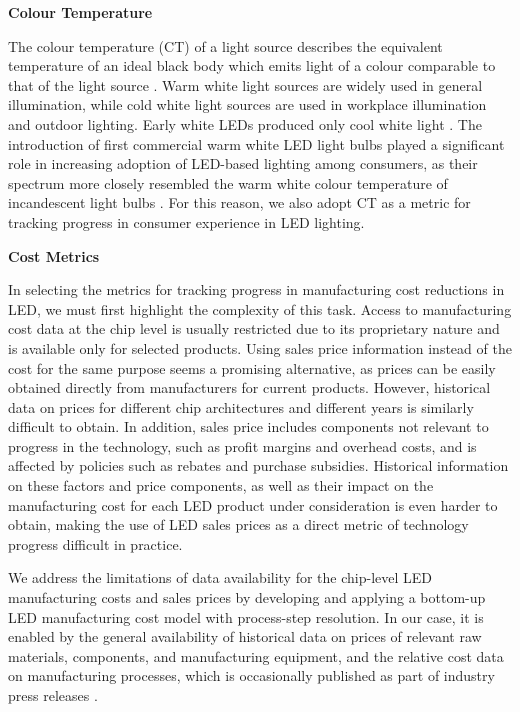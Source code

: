 \documentclass[parskip=full]{article}
\begin{document}
\textbf{Colour Temperature}

The colour temperature (CT) of a light source describes the equivalent temperature of an ideal black body which emits light of a colour comparable to that of the light source \cite{commission2011cie}. Warm white light sources are widely used in general illumination, while cold white light sources are used in workplace illumination and outdoor lighting. Early white LEDs produced only cool white light \cite{mueller2000light}. The introduction of first commercial warm white LED light bulbs played a significant role in increasing adoption of LED-based lighting among consumers, as their spectrum more closely resembled the warm white colour temperature of incandescent light bulbs \cite{al2016optics}. For this reason, we also adopt CT as a metric for tracking progress in consumer experience in LED lighting.

\textbf{Cost Metrics}

In selecting the metrics for tracking progress in manufacturing cost reductions in LED, we must first highlight the complexity of this task. Access to manufacturing cost data at the chip level is usually restricted due to its proprietary nature and is available only for selected products. Using sales price information instead of the cost for the same purpose seems a promising alternative, as prices can be easily obtained directly from manufacturers for current products. However, historical data on prices for different chip architectures and different years is similarly difficult to obtain. In addition, sales price includes components not relevant to progress in the technology, such as profit margins and overhead costs, and is affected by policies such as rebates and purchase subsidies. Historical information on these factors and price components, as well as their impact on the manufacturing cost for each LED product under consideration is even harder to obtain, making the use of LED sales prices as a direct metric of technology progress difficult in practice.

We address the limitations of data availability for the chip-level LED manufacturing costs and sales prices by developing and applying a bottom-up LED manufacturing cost model with process-step resolution. In our case, it is enabled by the general availability of historical data on prices of relevant raw materials, components, and manufacturing equipment, and the relative cost data on manufacturing processes, which is occasionally published as part of industry press releases \cite{ledinside2013csp}\cite{seoul2015csp}. 
\end{document}
